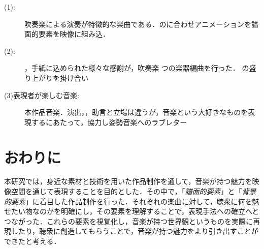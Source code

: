 \begin{description}
    \item[(1):] 吹奏楽による演奏が特徴的な楽曲である．のに合わせアニメーションを譜面的要素を映像に組み込．
    \item[(2):]
          ，手紙に込められた様々な感謝が，吹奏楽
          つの楽器編曲を行った．
          の盛り上がりを掛け合い
    \item[(3)表現者が楽しむ音楽:] 本作品音楽．演出，，助言と立場は違うが，音楽という大好きなものを表現するにあたって，協力し姿勢音楽へのラブレター
\end{description}

\sectionmargin
\section{おわりに}
本研究では，身近な素材と技術を用いた作品制作を通して，音楽が持つ魅力を映像空間を通じて表現することを目的とした．その中で，「\emph{譜面的要素}」と「\emph{背景的要素}」に着目した作品制作を行った．それぞれの楽曲に対して，聴衆に何を魅せたい物なのかを明確にし，その要素を理解することで，表現手法への確立へとつながった．これらの要素を視覚化し，音楽が持つ世界観というものを実際に再現したり，聴衆に創造してもらうことで，音楽が持つ魅力をより引き出すことができたと考える．


\sectionmargin\sectionmargin
\scriptsize